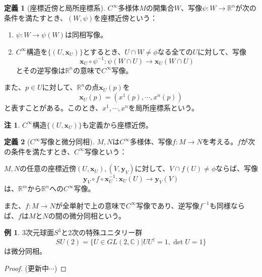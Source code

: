 \documentclass[unicode,a4paper,11pt]{ltjsarticle}
\theoremstyle{definition}
\newtheorem{dfn}{定義}[section]
\newtheorem{exm}{例}[section]
\newtheorem{rmk}{注}[section]
\begin{document}
\begin{dfn}[座標近傍と局所座標系]
  $C^{\infty}$多様体$M$の開集合$W$、写像$\psi:W\rightarrow\mathbb{R}^{n}$が次の条件を満たすとき、$(W,\psi)$を座標近傍という：
  \begin{enumerate}
    \item
          $\psi:W\rightarrow\psi(W)$は同相写像。
    \item
          $C^{\infty}$構造を$\{(U,\bm{x}_{U})\}$とするとき、$U\cap W\neq\phi$なる全ての$U$に対して、写像
          \begin{equation}
            \bm{x}_{U}\circ\psi^{-1}
            :
            \psi(W\cap U)\rightarrow \bm{x}_{U}(W\cap U)
          \end{equation}
          とその逆写像は$\mathbb{R}^{n}$の意味で$C^{\infty}$写像。
  \end{enumerate}

  また、$p\in U$に対して、$\mathbb{R}^{n}$の点$\bm{x}_{U}(p)$を
  \begin{equation}
    \bm{x}_{U}(p)
    =
    (x^{1}(p),\cdots,x^{n}(p))
  \end{equation}
  と表すことがある。このとき、$x^{1},\cdots,x^{n}$を局所座標系という。
\end{dfn}

\begin{rmk}
  $C^{\infty}$構造$\{(U,\bm{x}_{U})\}$も定義から座標近傍。
\end{rmk}

\begin{dfn}[$C^{\infty}$写像と微分同相]
  $M,N$は$C^{\infty}$多様体、写像$f:M\rightarrow N$を考える。$f$が次の条件を満たすとき、$C^{\infty}$写像という：
  \begin{flushleft}
    $M,N$の任意の座標近傍$(U,\bm{x}_{U}),(V,\bm{y}_{V})$に対して、$V\cap f(U)\neq\phi$ならば、写像
    \begin{equation}
      \bm{y}_{V}\circ f\circ\bm{x}_{U}^{-1}
      :
      \bm{x}_{U}(U)\rightarrow\bm{y}_{V}(V)
    \end{equation}
    は、$\mathbb{R}^{m}$から$\mathbb{R}^{n}$への$C^{\infty}$写像。
  \end{flushleft}
  また、$f:M\rightarrow N$が全単射で上の意味で$C^{\infty}$写像であり、逆写像$f^{-1}$も同様ならば、$f$は$M$と$N$の間の微分同相という。
\end{dfn}

\begin{exm}
  3次元球面$S^{3}$と2次の特殊ユニタリー群
  \begin{equation}
    SU(2)
    =
    \{U\in GL(2,\mathbb{C})|UU^{\dag}=1,\det U=1\}
  \end{equation}
  は微分同相。
  \begin{proof}
    \label{prf:eg_s3_unitary}
    (更新中$\cdots$)
  \end{proof}
\end{exm}
\end{document}
